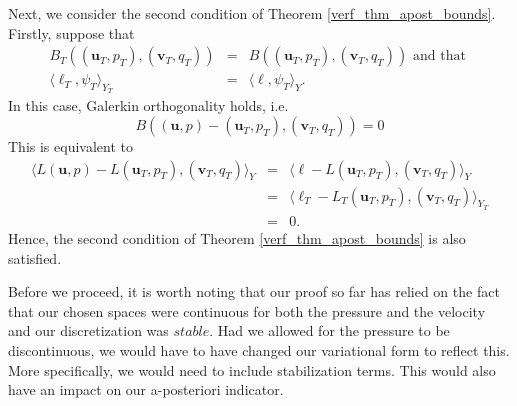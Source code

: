 \documentclass[12pt,a4paper]{article}
\theoremstyle{definition}
\begin{document}
Next, we consider the second condition of Theorem \ref{verf_thm_apost_bounds}.  Firstly, suppose that
\begin{eqnarray}
B_T\left(\left(\textbf{u}_T,p_T\right),\left(\textbf{v}_T,q_T\right)\right)&=&B\left(\left(\textbf{u}_T,p_T\right),\left(\textbf{v}_T,q_T\right)\right)\text{ and that }\\
\langle \ell_T,\psi_T \rangle_{Y_T}&=&\langle \ell,\psi_T \rangle_{Y}.
\end{eqnarray}
In this case,  Galerkin orthogonality holds, i.e.
\begin{equation}
B\left(\left(\textbf{u},p\right)-\left(\textbf{u}_T,p_T\right),\left(\textbf{v}_T,q_T\right)\right) = 0
\end{equation} 
This is equivalent to 
\begin{eqnarray}
\langle L\left(\textbf{u},p\right)-L\left(\textbf{u}_T,p_T\right),\left(\textbf{v}_T,q_T\right)\rangle_Y&=&\langle \ell - L\left(\textbf{u}_T,p_T\right),\left(\textbf{v}_T,q_T\right) \rangle_Y\nonumber\\
&=&\langle \ell_T - L_T\left(\textbf{u}_T,p_T\right),\left(\textbf{v}_T,q_T\right) \rangle_{Y_T}\nonumber\\
&=&0.\nonumber
\end{eqnarray}
Hence, the second condition of Theorem \ref{verf_thm_apost_bounds} is also satisfied.  

Before we proceed, it is worth noting that our proof so far has relied on the fact that our chosen spaces were continuous for both the pressure and the velocity and our discretization was $\textit{stable}$.   Had we allowed for the pressure to be discontinuous, we would have to have changed our variational form to reflect this.  More specifically, we would need to include stabilization terms.  This would also have an impact on our a-posteriori indicator.
\end{document}
